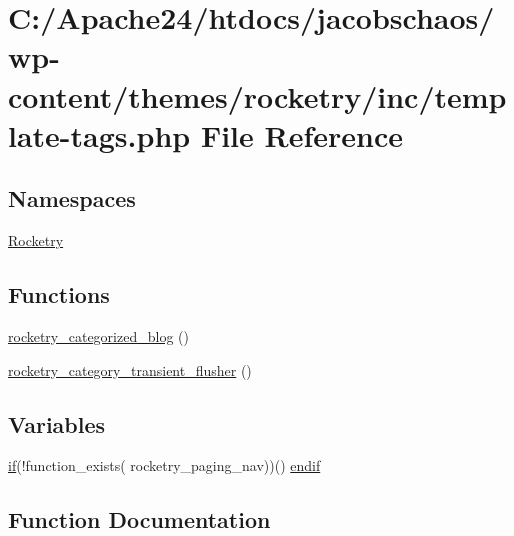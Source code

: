 \hypertarget{template-tags_8php}{}\section{C\+:/\+Apache24/htdocs/jacobschaos/wp-\/content/themes/rocketry/inc/template-\/tags.php File Reference}
\label{template-tags_8php}
\subsection*{Namespaces}
\begin{DoxyCompactItemize}
\item 
 \hyperlink{namespace_rocketry}{Rocketry}
\end{DoxyCompactItemize}
\subsection*{Functions}
\begin{DoxyCompactItemize}
\item 
\hyperlink{template-tags_8php_a7ae0c17787427333f27d767c8913e901}{rocketry\+\_\+categorized\+\_\+blog} ()
\item 
\hyperlink{template-tags_8php_a4a828cd481cb3a7007dabe9449d91a4d}{rocketry\+\_\+category\+\_\+transient\+\_\+flusher} ()
\end{DoxyCompactItemize}
\subsection*{Variables}
\begin{DoxyCompactItemize}
\item 
\hyperlink{skip-link-focus-fix_8js_abec33d9ccd80b36e9944d11422db042c}{if}(!function\+\_\+exists( \textquotesingle{}rocketry\+\_\+paging\+\_\+nav\textquotesingle{}))() \hyperlink{template-tags_8php_acdefad5d06e88cf27f46145ddd9b2cdb}{endif}
\end{DoxyCompactItemize}


\subsection{Function Documentation}
\hypertarget{template-tags_8php_a7ae0c17787427333f27d767c8913e901}{}
